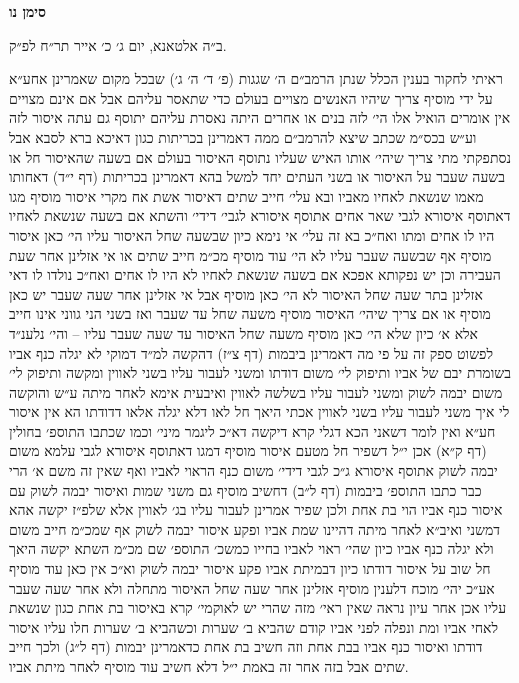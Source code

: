 \documentclass[12pt, openany]{book}
\newcommand{\chapname}{}
\newcommand{\newchap}[1]{
	\addcontentsline{toc}{chapter}{#1}
	\renewcommand{\chapname}{#1}
		\begin{center}
			\textbf{%
\fontsize{16pt}{16pt}\selectfont
				#1}
		\end{center}
}
\begin{document}
\newchap{סימן נו}
\begin{multicols}{2}
ב״ה אלטאנא, יום ג׳ כ׳ אייר תר״ח לפ״ק.\\\vspace{0pt}

ראיתי לחקור בענין הכלל שנתן הרמב״ם ה׳ שגגות (פ׳ ד׳ ה׳ ג׳) שבכל מקום שאמרינן אחע״א על ידי מוסיף צריך שיהיו האנשים מצויים בעולם כדי שתאסר עליהם אבל אם אינם מצויים אין אומרים הואיל אלו הי׳ לזה בנים או אחרים היתה נאסרת עליהם יתוסף גם עתה איסור לזה וע״ש בכס״מ שכתב שיצא להרמב״ם ממה דאמרינן בכריתות כגון דאיכא ברא לסבא אבל נסתפקתי מתי צריך שיהי׳ אותו האיש שעליו נתוסף האיסור בעולם אם בשעה שהאיסור חל או בשעה שעבר על האיסור או בשני העתים יחד למשל בהא דאמרינן בכריתות (דף י״ד) דאחותו מאמו שנשאת לאחיו מאביו ובא עלי׳ חייב שתים דאיסור אשת אח מקרי איסור מוסיף מגו דאתוסף איסורא לגבי שאר אחים אתוסף איסורא לגבי׳ דידי׳ והשתא אם בשעה שנשאת לאחיו היו לו אחים ומתו ואח״כ בא זה עלי׳ אי נימא כיון שבשעה שחל האיסור עליו הי׳ כאן איסור מוסיף אף שבשעה שעבר עליו לא הי׳ עוד מוסיף מכ״מ חייב שתים או אי אזלינן אחר שעת העבירה וכן יש נפקותא אפכא אם בשעה שנשאת לאחיו לא היו לו אחים ואח״כ נולדו לו דאי אזלינן בתר שעה שחל האיסור לא הי׳ כאן מוסיף אבל אי אזלינן אחר שעה שעבר יש כאן מוסיף או אם צריך שיהי׳ האיסור מוסיף משעה שחל עד שעבר ואז בשני הני גווני אינו חייב אלא א׳ כיון שלא הי׳ כאן מוסיף משעה שחל האיסור עד שעה שעבר עליו – והי׳ נלענ״ד לפשוט ספק זה על פי מה דאמרינן ביבמות (דף צ״ז) דהקשה למ״ד דמוקי לא יגלה כנף אביו בשומרת יבם של אביו ותיפוק לי׳ משום דודתו ומשני לעבור עליו בשני לאווין ומקשה ותיפוק לי׳ משום יבמה לשוק ומשני לעבור עליו בשלשה לאווין ואיבעית אימא לאחר מיתה ע״ש והוקשה לי איך משני לעבור עליו בשני לאווין אכתי היאך חל לאו דלא יגלה אלאו דדודתו הא אין איסור חע״א ואין לומר דשאני הכא דגלי קרא דיקשה דא״כ ליגמר מיני׳ וכמו שכתבו התוספ׳ בחולין (דף ק״א) אכן י״ל דשפיר חל מטעם איסור מוסיף דמגו דאתוסף איסורא לגבי עלמא משום יבמה לשוק אתוסף איסורא ג״כ לגבי דידי׳ משום כנף הראוי לאביו ואף שאין זה משם א׳ הרי כבר כתבו התוספ׳ ביבמות (דף ל״ב) דחשיב מוסיף גם משני שמות ואיסור יבמה לשוק עם איסור כנף אביו הוי בת אחת ולכן שפיר אמרינן לעבור עליו בג׳ לאווין אלא שלפ״ז יקשה אהא דמשני ואיב״א לאחר מיתה דהיינו שמת אביו ופקע איסור יבמה לשוק אף שמכ״מ חייב משום ולא יגלה כנף אביו כיון שהי׳ ראוי לאביו בחייו כמשכ׳ התוספ׳ שם מכ״מ השתא יקשה היאך חל שוב על איסור דודתו כיון דבמיתת אביו פקע איסור יבמה לשוק וא״כ אין כאן עוד מוסיף אע״כ יהי׳ מוכח דלענין מוסיף אזלינן אחר שעה שחל האיסור מתחלה ולא אחר שעה שעבר עליו אכן אחר עיון נראה שאין ראי׳ מזה שהרי יש לאוקמי׳ קרא באיסור בת אחת כגון שנשאת לאחי אביו ומת ונפלה לפני אביו קודם שהביא ב׳ שערות וכשהביא ב׳ שערות חלו עליו איסור דודתו ואיסור כנף אביו בבת אחת וזה חשיב בת אחת כדאמרינן יבמות (דף ל״ג) ולכך חייב שתים אבל בזה אחר זה באמת י״ל דלא חשיב עוד מוסיף לאחר מיתת אביו.\\\vspace{0pt}


\end{multicols}
\end{document}

